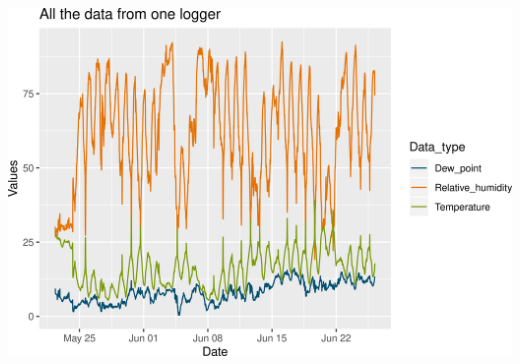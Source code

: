 \documentclass[]{article}
\begin{document}
\includegraphics{figure/unnamed-chunk-13-1.png}
\end{document}
